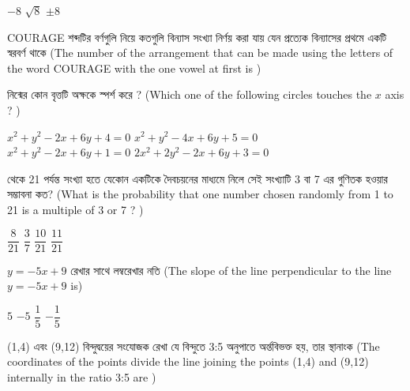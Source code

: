 \documentclass[addpoints]{exam}
\begin{document}
\begin{questions}
\begin{oneparchoices}
\choice $ -8 $
\choice $ \sqrt{8} $
\choice $ \pm 8 $

\end{oneparchoices}


\question  COURAGE শব্দটির বর্ণগুলি নিয়ে কতগুলি বিন্যাস সংখ্যা নির্ণয় করা যায় যেন প্রত্যেক বিন্যাসের প্রথমে একটি স্বরবর্ণ থাকে (The number of the arrangement that can be made using the letters of the word COURAGE with the one vowel at first is )

\begin{oneparchoices}

\end{oneparchoices}

\question  নিন্মের কোন বৃত্তটি অক্ষকে স্পর্শ করে ? (Which one of the following circles touches the $ x $ axis ? )

\begin{oneparchoices}
\choice $ x^{2} + y^{2}-2x+6y+4=0 $
\choice $ x^{2} + y^{2}-4x+6y+5=0 $\\
\hspace*{-.35cm}\choice $ x^{2} + y^{2}-2x+6y+1=0 $
\choice $ 2x^{2} + 2y^{2}-2x+6y+3=0 $

\end{oneparchoices}

  থেকে 21 পর্যন্ত সংখ্যা হতে যেকোন একটিকে দৈবচয়নের মাধ্যমে নিলে সেই সংখ্যাটি 3 বা 7 এর গুণিতক হওয়ার সম্ভাবনা কত? (What is the probability that one number chosen randomly from 1 to 21 is a multiple of 3 or 7 ? )

\begin{oneparchoices}
\choice $ \dfrac{8}{21} $
\choice $ \dfrac{3}{7} $
\choice $ \dfrac{10}{21} $
\choice $ \dfrac{11}{21} $

\end{oneparchoices}

\question  $ y = -5x+9 $ রেখার সাথে লম্বরেখার ‍নতি (The slope of the line perpendicular to the line $ y = -5x+9 $ is)

\begin{oneparchoices}
\choice $ 5 $
\choice $ -5 $
\choice $ \dfrac{1}{5} $
\choice $- \dfrac{1}{5}$

\end{oneparchoices}


\question  (1,4) এবং (9,12) বিন্দুদ্বয়ের সংযোজক রেখা যে বিন্দুতে 3:5 অনুপাতে অর্ন্তবিভক্ত হয়, তার স্থানাংক (The coordinates of the points divide the line joining the points (1,4) and (9,12) internally in the ratio 3:5 are )


\end{questions}
\end{document}
